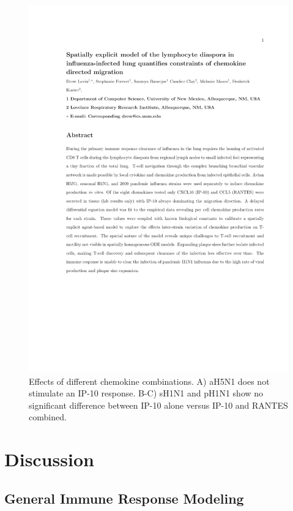 \documentclass[10pt]{article}
\begin{document}
\begin{figure}[ht!]
\begin{center}
	\includegraphics[width=\textwidth]{chemokine}
	\caption{Effects of different chemokine combinations.  A) aH5N1 does not stimulate an IP-10 response.  B-C) sH1N1 and pH1N1 show no significant difference between IP-10 alone versus IP-10 and RANTES combined.}
	\label{fig:chemokine}
\end{center}
\end{figure}



\section*{Discussion}

\subsection*{General Immune Response Modeling}
\end{document}
